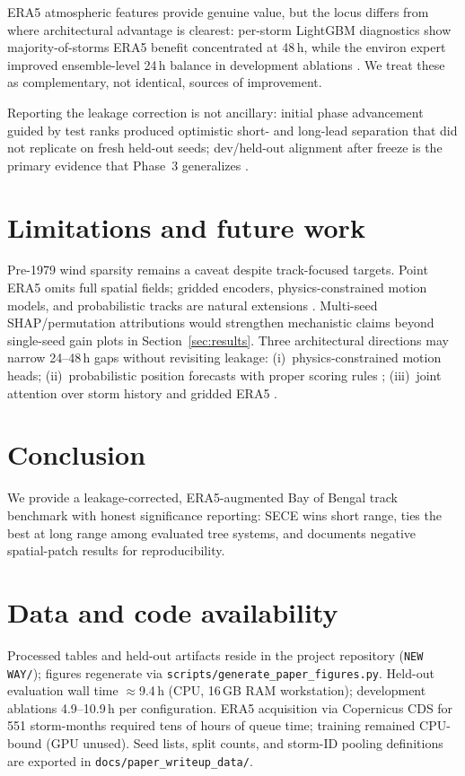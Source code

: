 \documentclass[11pt]{article}
\newcommand{\sece}{SECE}
\newcommand{\bob}{Bay of Bengal}
\newcommand{\era}{ERA5}
\begin{document}
\era{} atmospheric features provide genuine value, but the locus differs from where architectural advantage is clearest: per-storm LightGBM diagnostics show majority-of-storms \era{} benefit concentrated at 48\,h, while the environ expert improved ensemble-level 24\,h balance in development ablations \cite{prat2021,barnes2013,reichstein2019}.
We treat these as complementary, not identical, sources of improvement.

Reporting the leakage correction is not ancillary: initial phase advancement guided by test ranks produced optimistic short- and long-lead separation that did not replicate on fresh held-out seeds; dev/held-out alignment after freeze is the primary evidence that Phase~3 generalizes \cite{cawley2010,gneiting2014}.

\section{Limitations and future work}
Pre-1979 wind sparsity remains a caveat despite track-focused targets.
Point \era{} omits full spatial fields; gridded encoders, physics-constrained motion models, and probabilistic tracks are natural extensions \cite{moller2018,gneiting2014,chen2020,berg2013}.
Multi-seed SHAP/permutation attributions would strengthen mechanistic claims beyond single-seed gain plots in Section~\ref{sec:results}.
Three architectural directions may narrow 24--48\,h gaps without revisiting leakage: (i)~physics-constrained motion heads; (ii)~probabilistic position forecasts with proper scoring rules \cite{moller2018,gneiting2014}; (iii)~joint attention over storm history and gridded \era{} \cite{chen2020,lee2021,berg2013}.

\section{Conclusion}
We provide a leakage-corrected, \era{}-augmented \bob{} track benchmark with honest significance reporting: \sece{} wins short range, ties the best at long range among evaluated tree systems, and documents negative spatial-patch results for reproducibility.

\section*{Data and code availability}
Processed tables and held-out artifacts reside in the project repository (\texttt{NEW WAY/}); figures regenerate via \texttt{scripts/generate\_paper\_figures.py}.
Held-out evaluation wall time $\approx$9.4\,h (CPU, 16\,GB RAM workstation); development ablations 4.9--10.9\,h per configuration.
\era{} acquisition via Copernicus CDS for 551 storm-months required tens of hours of queue time; training remained CPU-bound (GPU unused).
Seed lists, split counts, and storm-ID pooling definitions are exported in \texttt{docs/paper\_writeup\_data/}.
\end{document}
